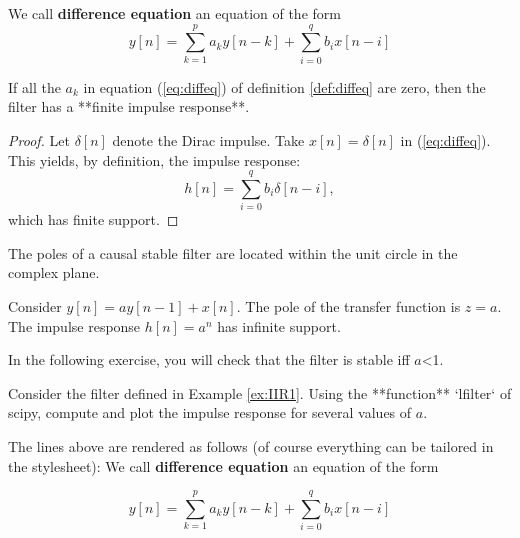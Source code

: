     \begin{listing}
\begin{definition} \label{def:diffeq}
We call \textbf{difference equation} an equation of the form
$$
\label{eq:diffeq}
y[n]= \sum_{k=1}^{p} a_k y[n-k] + \sum_{i=0}^q b_i x[n-i]
$$
\end{definition}

\begin{property}
If all the $a_k$ in equation (\ref{eq:diffeq}) of definition \ref{def:diffeq} are zero, then the filter has a **finite impulse response**. 
\end{property}

\begin{proof}
Let $\delta[n]$ denote the Dirac impulse. Take $x[n]=\delta[n]$ in (\ref{eq:diffeq}). This yields, by definition, the impulse response:
$$
\label{eq:fir}
h[n]= \sum_{i=0}^q b_i \delta[n-i],
$$
which has finite support. 
\end{proof}

\begin{theorem}
The poles of a causal stable filter are located within the unit circle in the complex plane.
\end{theorem}

\begin{example} \label{ex:IIR1}
Consider $y[n]= a y[n-1] +  x[n]$. The pole of the transfer function is $z=a$. The impulse response $h[n]=a^n$ has infinite support.
\end{example}

In the following exercise, you will check that the filter is stable iff $a$<1.

\begin{exercise}\label{ex:exofilter}
Consider the filter defined in Example \ref{ex:IIR1}. Using the **function** `lfilter` of scipy, compute and plot the impulse response for several values of $a$.
\end{exercise}

\end{listing}

    The lines above are rendered as follows (of course everything can be
tailored in the stylesheet): %
\label{def:diffeq} We call \textbf{difference equation} an equation of
the form

\begin{equation}
\label{eq:diffeq}
y[n]= \sum_{k=1}^{p} a_k y[n-k] + \sum_{i=0}^q b_i x[n-i]
\end{equation}

